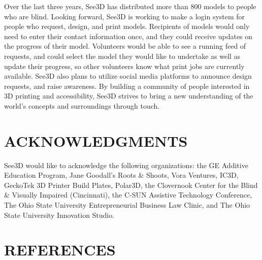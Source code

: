 \documentclass[11.5pt]{sig-alternate} %
\begin{document}
\begin{large}
Over the last three years, See3D has distributed more than 800 models to people who are blind. Looking forward, See3D is working to make a login system for people who request, design, and print models. Recipients of models would only need to enter their contact information once, and they could receive updates on the progress of their model. Volunteers would be able to see a running feed of requests, and could select the model they would like to undertake as well as update their progress, so other volunteers know what print jobs are currently available. See3D also plans to utilize social media platforms to announce design requests, and raise awareness. By building a community of people interested in 3D printing and accessibility, See3D strives to bring a new understanding of the world’s concepts and surroundings through touch.  

\section*{ACKNOWLEDGMENTS}

See3D would like to acknowledge the following organizations: the GE Additive Education Program, Jane Goodall’s Roots \& Shoots, Vora Ventures, IC3D, GeckoTek 3D Printer Build Plates, Polar3D, the Clovernook Center for the Blind \& Visually Impaired (Cincinnati), the C-SUN Assistive Technology Conference, The Ohio State University Entrepreneurial Business Law Clinic, and The Ohio State University Innovation Studio.

\end{large}
\clearpage
\section*{REFERENCES}\par 
\end{document}
